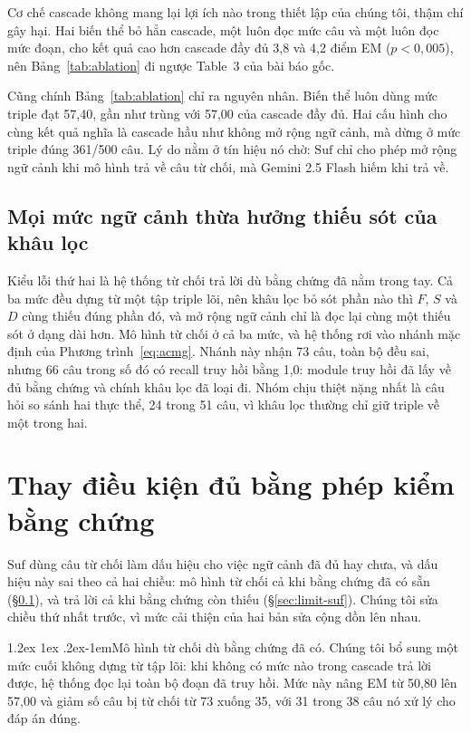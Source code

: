 \documentclass[11pt]{article}
\makeatletter
\renewcommand\paragraph{\@startsection{paragraph}{4}{\z@}%
  {1.2ex \@plus1ex \@minus.2ex}{-1em}{\normalfont\normalsize\bfseries}}
\makeatother
\begin{document}
Cơ chế cascade không mang lại lợi ích nào trong thiết lập của chúng tôi, thậm chí gây hại.
Hai biến thể bỏ hẳn cascade, một luôn đọc mức câu và một luôn đọc mức đoạn, cho kết quả cao
hơn cascade đầy đủ 3,8 và 4,2 điểm EM ($p < 0{,}005$), nên Bảng~\ref{tab:ablation} đi ngược
Table~3 của bài báo gốc.

Cũng chính Bảng~\ref{tab:ablation} chỉ ra nguyên nhân. Biến thể luôn dùng mức triple đạt
57,40, gần như trùng với 57,00 của cascade đầy đủ. Hai cấu hình cho cùng kết quả nghĩa là
cascade hầu như không mở rộng ngữ cảnh, mà dừng ở mức triple đúng 361/500 câu. Lý do nằm ở
tín hiệu nó chờ: $\mathrm{Suf}$ chỉ cho phép mở rộng ngữ cảnh khi mô hình trả về câu từ
chối, mà Gemini 2.5 Flash hiếm khi trả về.

\subsection{Mọi mức ngữ cảnh thừa hưởng thiếu sót của khâu lọc}
\label{sec:limit-empty}

Kiểu lỗi thứ hai là hệ thống từ chối trả lời dù bằng chứng đã nằm trong tay. Cả ba mức đều
dựng từ một tập triple lõi, nên khâu lọc bỏ sót phần nào thì $F$, $S$ và $D$ cùng thiếu đúng
phần đó, và mở rộng ngữ cảnh chỉ là đọc lại cùng một thiếu sót ở dạng dài hơn. Mô hình từ
chối ở cả ba mức, và hệ thống rơi vào nhánh mặc định của Phương trình~\ref{eq:acmg}. Nhánh
này nhận 73 câu, toàn bộ đều sai, nhưng 66 câu trong số đó có recall truy hồi bằng 1,0:
module truy hồi đã lấy về đủ bằng chứng và chính khâu lọc đã loại đi. Nhóm chịu thiệt nặng
nhất là câu hỏi so sánh hai thực thể, 24 trong 51 câu, vì khâu lọc thường chỉ giữ triple về
một trong hai.

\section{Thay điều kiện đủ bằng phép kiểm bằng chứng}
\label{sec:fix}

$\mathrm{Suf}$ dùng câu từ chối làm dấu hiệu cho việc ngữ cảnh đã đủ hay chưa, và dấu hiệu
này sai theo cả hai chiều: mô hình từ chối cả khi bằng chứng đã có sẵn
(\S\ref{sec:limit-empty}), và trả lời cả khi bằng chứng còn thiếu (\S\ref{sec:limit-suf}).
Chúng tôi sửa chiều thứ nhất trước, vì mức cải thiện của hai bản sửa cộng dồn lên nhau.

\paragraph{Mô hình từ chối dù bằng chứng đã có.} Chúng tôi bổ sung một mức cuối không dựng
từ tập lõi: khi không có mức nào trong cascade trả lời được, hệ thống đọc lại toàn bộ đoạn đã
truy hồi. Mức này nâng EM từ 50,80 lên 57,00 và giảm số câu bị từ chối từ 73 xuống 35, với 31
trong 38 câu nó xử lý cho đáp án đúng.
\end{document}
